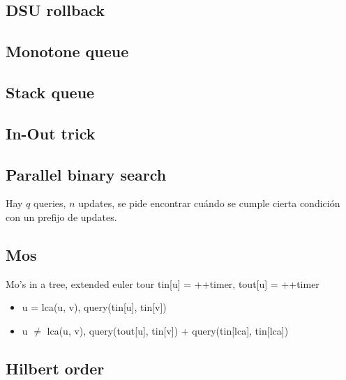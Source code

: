 
\subsection{DSU rollback }

\subsection{Monotone queue }


\subsection{Stack queue }


\subsection{In-Out trick }

\subsection{Parallel binary search }

Hay $q$ queries, $n$ updates, se pide encontrar cuándo se cumple cierta condición con un prefijo de updates.

\subsection{Mos }

Mo's in a tree, extended euler tour tin[u] = ++timer, tout[u] = ++timer 

\begin{itemize}
\item u = lca(u, v), query(tin[u], tin[v])
\item u $\neq$ lca(u, v), query(tout[u], tin[v]) + query(tin[lca], tin[lca]) 
\end{itemize}



\subsection{Hilbert order }


